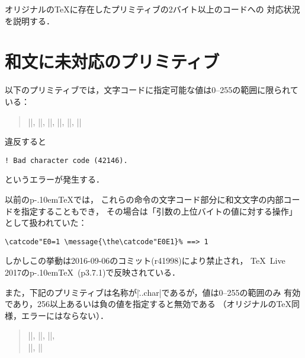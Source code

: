 \documentclass[a4paper,11pt,nomag]{jsarticle}
\def\pTeX{p\kern-.10em\TeX}
\begin{document}
オリジナルの\TeX に存在したプリミティブの2バイト以上のコードへの
対応状況を説明する．

\section{和文に未対応のプリミティブ}
以下のプリミティブでは，文字コードに指定可能な値は0--255の範囲に限られている：
\begin{quote}
 |\catcode|,
 |\sfcode|,
 |\mathcode|,
 |\delcode|,
 |\lccode|,
 |\uccode|
\end{quote}
違反すると
\begin{verbatim}
! Bad character code (42146).
\end{verbatim}
というエラーが発生する．
\begin{dangerous}
以前の\pTeX では，
これらの命令の文字コード部分に和文文字の内部コードを指定することもでき，
その場合は「引数の上位バイトの値に対する操作」として扱われていた：
\begin{verbatim}
\catcode"E0=1 \message{\the\catcode"E0E1}% ==> 1
\end{verbatim}
しかしこの挙動は2016-09-06のコミット(r41998)により禁止され，
\TeX~Live 2017の\pTeX~(p3.7.1)で反映されている．
\end{dangerous}

また，下記のプリミティブは名称が|\...char|であるが，値は0--255の範囲のみ
有効であり，256以上あるいは負の値を指定すると無効である
（オリジナルの\TeX 同様，エラーにはならない）．
\begin{quote}
 |\endlinechar|,
 |\newlinechar|,
 |\escapechar|,\\
 ||,
 ||
\end{quote}

\end{document}
